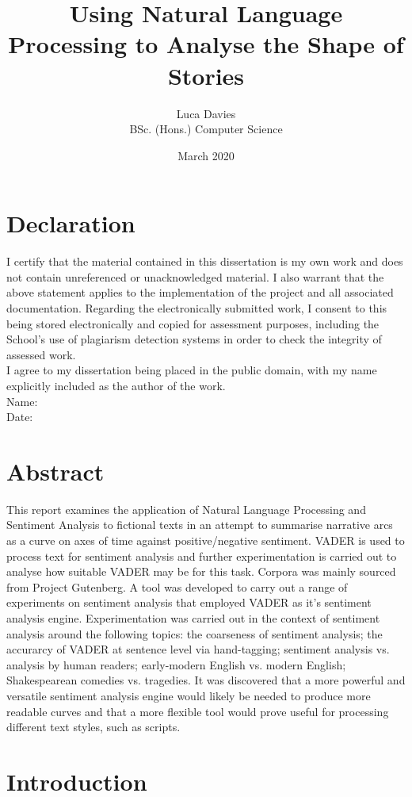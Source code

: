 \documentclass{article}
\title{\textbf{Using Natural Language Processing to Analyse the Shape of Stories}}
\author{
Luca Davies \\ BSc. (Hons.) Computer Science}
\date{March 2020}
\begin{document}
\maketitle
\newpage
\section*{Declaration}
    I certify that the material contained in this dissertation is my own work and does not contain unreferenced or unacknowledged material. I also warrant that the above statement applies to the implementation of the project and all associated documentation. Regarding the electronically submitted work, I consent to this being stored electronically and copied for assessment purposes, including the School’s use of plagiarism detection systems in order to check the integrity of assessed work. \\
    I agree to my dissertation being placed in the public domain, with my name explicitly included as the author of the work. \\
    
    \noindent
    Name: \\
    Date:
\newpage
\section*{Abstract}
    This report examines the application of Natural Language Processing and Sentiment Analysis to fictional texts in an attempt to summarise narrative arcs as a curve on axes of time against positive/negative sentiment. VADER is used to process text for sentiment analysis and further experimentation is carried out to analyse how suitable VADER may be for this task. Corpora was mainly sourced from Project Gutenberg. A tool was developed to carry out a range of experiments on sentiment analysis that employed VADER as it's sentiment analysis engine. Experimentation was carried out in the context of sentiment analysis around the following topics: the coarseness of sentiment analysis; the accurarcy of VADER at sentence level via hand-tagging; sentiment analysis vs. analysis by human readers; early-modern English vs. modern English; Shakespearean comedies vs. tragedies. It was discovered that a more powerful and versatile sentiment analysis engine would likely be needed to produce more readable curves and that a more flexible tool would prove useful for processing different text styles, such as scripts.
\newpage
\tableofcontents
\newpage
\section{Introduction}
\end{document}
